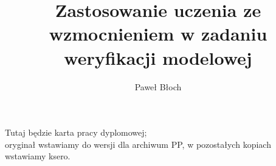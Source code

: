 \documentclass[polish,bachelor,a4paper,oneside]{ppfcmthesis}
\author{%
   Paweł Błoch \album{145375} 
}
\title{Zastosowanie uczenia ze wzmocnieniem w zadaniu weryfikacji modelowej}
\begin{document}
\frontmatter\pagestyle{empty}%
\maketitle\cleardoublepage%


\thispagestyle{empty}\vspace*{\fill}%
\begin{center}Tutaj będzie karta pracy dyplomowej;\\oryginał wstawiamy do wersji dla archiwum PP, w pozostałych kopiach wstawiamy ksero.\end{center}%
\vfill\cleardoublepage%


\pagestyle{ppfcmthesis}%
\tableofcontents* 
\cleardoublepage %


\mainmatter%





\end{document}
